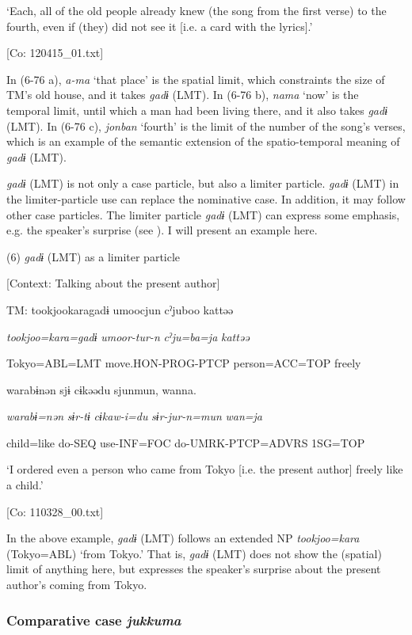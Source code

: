     ‘Each, all of the old people already knew (the song from the first verse) to the fourth, even if (they) did not see it [i.e. a card with the lyrics].’

    [Co: 120415\_01.txt]

In (6-76 a), \textit{a-ma} ‘that place’ is the spatial limit, which constraints the size of TM’s old house, and it takes \textit{gadɨ} (LMT). In (6-76 b), \textit{nama} ‘now’ is the temporal limit, until which a man had been living there, and it also takes \textit{gadɨ} (LMT). In (6-76 c), \textit{jonban} ‘fourth’ is the limit of the number of the song’s verses, which is an example of the semantic extension of the spatio-temporal meaning of \textit{gadɨ} (LMT).

\textit{gadɨ} (LMT) is not only a case particle, but also a limiter particle. \textit{gadɨ} (LMT) in the limiter-particle use can replace the nominative case. In addition, it may follow other case particles. The limiter particle \textit{gadɨ} (LMT) can express some emphasis, e.g. the speaker’s surprise (see ). I will present an example here.

(6)  \textit{gadɨ} (LMT) as a limiter particle

  [Context: Talking about the present author]

  TM:  tookjookaragadɨ  umoocjun  cˀjuboo  kattəə

    \textit{tookjoo=kara=gadɨ}  \textit{umoor-tur-n}  \textit{cˀju=ba=ja}  \textit{kattəə}

    Tokyo=ABL=LMT  move.HON-PROG-PTCP  person=ACC=TOP  freely

    warabɨnən  sjɨ  cɨkəədu  sjunmun,  wanna.

    \textit{warabɨ=nən}  \textit{sɨr-tɨ}  \textit{cɨkaw-i=du}  \textit{sɨr-jur-n=mun}  \textit{wan=ja}

    child=like  do-SEQ  use-INF=FOC  do-UMRK-PTCP=ADVRS  1SG=TOP

    ‘I ordered even a person who came from Tokyo [i.e. the present author] freely like a child.’

    [Co: 110328\_00.txt]

In the above example, \textit{gadɨ} (LMT) follows an extended NP \textit{tookjoo=kara} (Tokyo=ABL) ‘from Tokyo.’ That is, \textit{gadɨ} (LMT) does not show the (spatial) limit of anything here, but expresses the speaker’s surprise about the present author’s coming from Tokyo.

\subsubsection{Comparative case \textit{jukkuma}}


